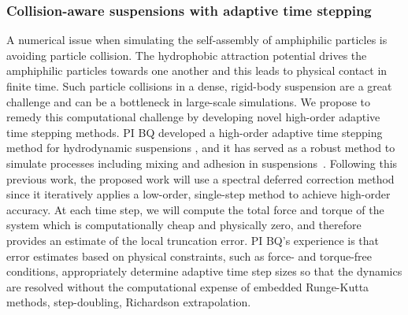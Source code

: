 \subsubsection{Collision-aware suspensions with adaptive time stepping}
\label{subsec:timeStepping}

A numerical issue when simulating the self-assembly of amphiphilic
particles is avoiding particle collision. The hydrophobic attraction
potential drives the amphiphilic particles towards one another and this
leads to physical contact in finite time. Such particle collisions in a
dense, rigid-body suspension are a great challenge and can be a
bottleneck in large-scale simulations. We propose to remedy this
computational challenge by developing novel high-order adaptive time
stepping methods. PI BQ developed a high-order adaptive time
stepping method for hydrodynamic suspensions \cite{qua-bir2016}, and it
has served as a robust method to simulate processes including mixing and
adhesion in suspensions~\cite{qua-vee-you2019, kab-qua-bir2017}.
Following this previous work, the proposed work will use a spectral
deferred correction method~\cite{dut-gre-rok2000} since it iteratively
applies a low-order, single-step method to achieve high-order accuracy.
At each time step, we will compute the total force and torque of the
system which is computationally cheap and physically zero, and therefore
provides an estimate of the local truncation error. PI BQ's experience
is that error estimates based on physical constraints, such as force-
and torque-free conditions, appropriately determine adaptive time step
sizes so that the dynamics are resolved without the computational
expense of embedded Runge-Kutta methods, step-doubling, Richardson
extrapolation.


